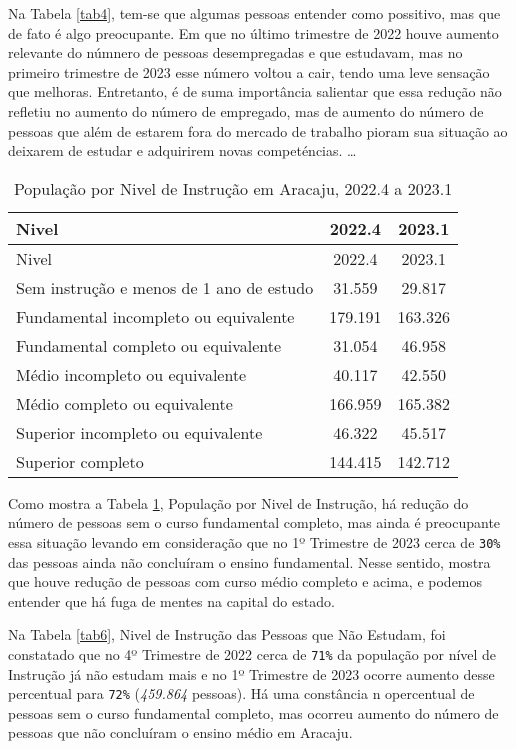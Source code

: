 Na Tabela \ref{tab4}, tem-se que algumas pessoas entender como
possitivo, mas que de fato é algo preocupante. Em que no último
trimestre de 2022 houve aumento relevante do númnero de pessoas
desempregadas e que estudavam, mas no primeiro trimestre de 2023 esse
número voltou a cair, tendo uma leve sensação que melhoras. Entretanto,
é de suma importância salientar que essa redução não refletiu no aumento
do número de empregado, mas de aumento do número de pessoas que além de
estarem fora do mercado de trabalho pioram sua situação ao deixarem de
estudar e adquirirem novas competéncias. \ldots{}

\begin{longtable}[]{@{}lcc@{}}
\caption{\label{tab5}População por Nivel de Instrução em Aracaju, 2022.4
a 2023.1}\tabularnewline
\toprule\noalign{}
Nivel & 2022.4 & 2023.1 \\
\midrule\noalign{}
\endfirsthead
\toprule\noalign{}
Nivel & 2022.4 & 2023.1 \\
\midrule\noalign{}
\endhead
\bottomrule\noalign{}
\endlastfoot
Sem instrução e menos de 1 ano de estudo & 31.559 & 29.817 \\
Fundamental incompleto ou equivalente & 179.191 & 163.326 \\
Fundamental completo ou equivalente & 31.054 & 46.958 \\
Médio incompleto ou equivalente & 40.117 & 42.550 \\
Médio completo ou equivalente & 166.959 & 165.382 \\
Superior incompleto ou equivalente & 46.322 & 45.517 \\
Superior completo & 144.415 & 142.712 \\
\end{longtable}

Como mostra a Tabela \ref{tab5}, População por Nivel de Instrução, há
redução do número de pessoas sem o curso fundamental completo, mas ainda
é preocupante essa situação levando em consideração que no 1º Trimestre
de 2023 cerca de \texttt{30\%} das pessoas ainda não concluíram o ensino
fundamental. Nesse sentido, mostra que houve redução de pessoas com
curso médio completo e acima, e podemos entender que há fuga de mentes
na capital do estado.

Na Tabela \ref{tab6}, Nivel de Instrução das Pessoas que Não Estudam,
foi constatado que no 4º Trimestre de 2022 cerca de \texttt{71\%} da
população por nível de Instrução já não estudam mais e no 1º Trimestre
de 2023 ocorre aumento desse percentual para \texttt{72\%}
(\emph{459.864} pessoas). Há uma constância n opercentual de pessoas sem
o curso fundamental completo, mas ocorreu aumento do número de pessoas
que não concluíram o ensino médio em Aracaju.

